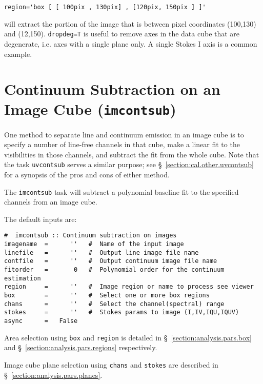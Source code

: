 \small
\begin{verbatim}
region='box [ [ 100pix , 130pix] , [120pix, 150pix ] ]'
\end{verbatim}
\normalsize

will extract the portion of the image that is between pixel
coordinates (100,130) and (12,150). {\tt dropdeg=T} is useful to remove
axes in the data cube that are degenerate, i.e. axes with a single
plane only. A single Stokes I axis is a common example.

\section{Continuum Subtraction on an Image Cube ({\tt imcontsub})}
\label{section:analysis.imcontsub}

One method to separate line and continuum emission in an image cube is
to specify a number of line-free channels in that cube, make a linear
fit to the visibilities in those channels, and subtract the fit from
the whole cube.  Note that the task {\tt uvcontsub} serves a similar
purpose; see \S~\ref{section:cal.other.uvcontsub} for a synopsis of
the pros and cons of either method.

The {\tt imcontsub} task will subtract a polynomial baseline fit to the
specified channels from an image cube.

The default inputs are: 
\small
\begin{verbatim}
#  imcontsub :: Continuum subtraction on images
imagename  =      ''   #  Name of the input image
linefile   =      ''   #  Output line image file name
contfile   =      ''   #  Output continuum image file name
fitorder   =       0   #  Polynomial order for the continuum estimation
region     =      ''   #  Image region or name to process see viewer
box        =      ''   #  Select one or more box regions
chans      =      ''   #  Select the channel(spectral) range
stokes     =      ''   #  Stokes params to image (I,IV,IQU,IQUV)
async      =   False   
\end{verbatim}
\normalsize

Area selection using {\tt box} and {\tt region} is detailed in 
\S~\ref{section:analysis.pars.box} and
\S~\ref{section:analysis.pars.regions} respectively.

Image cube plane selection using {\tt chans} and {\tt stokes}
are described in \S~\ref{section:analysis.pars.planes}.

